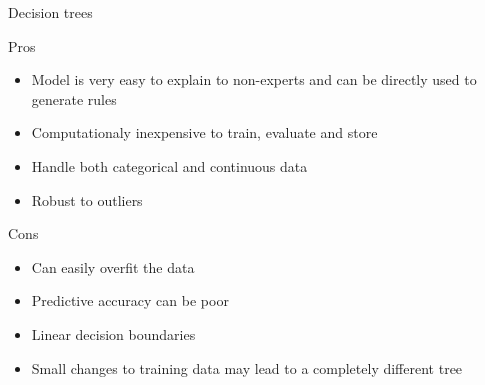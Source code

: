 \documentclass[pdf]{beamer}
\begin{document}
\begin{frame}{Decision trees}
\begin{exampleblock}{Pros}
\begin{itemize}
	\item Model is very easy to explain to non-experts and can be directly used to generate rules
	\item Computationaly inexpensive to train, evaluate and store 
	\item Handle both categorical and continuous data 
	\item Robust to outliers
\end{itemize}
\end{exampleblock}
\vfill
\begin{alertblock}{Cons}
\begin{itemize}
	\item Can easily overfit the data
	\item Predictive accuracy can be poor
	\item Linear decision boundaries 
	\item Small changes to training data may lead to a completely different tree
\end{itemize}
\end{alertblock}
\end{frame}
\end{document}
